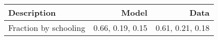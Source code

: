 \begin{tabular}{lrr}
\hline
Description & Model  & Data  \\ 
\hline
Fraction by schooling & 0.66, 0.19, 0.15  & 0.61, 0.21, 0.18  \\ 
\hline
\end{tabular}%
